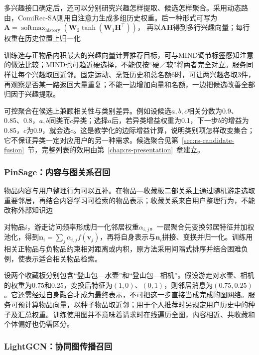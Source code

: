 多兴趣接口确定后，还可以分别研究兴趣怎样提取、候选怎样聚合。采用动态路由，ComiRec-SA则用自注意力生成多组历史权重。后一种形式可写为
$\bm A=\operatorname{softmax}_{\mathrm{history}}(\bm W_2\tanh(\bm W_1\bm H^\top))$，
再以$\bm A\bm H$得到多行兴趣向量；每行权重在历史位置上归一化

训练选与正物品内积最大的兴趣向量计算推荐目标，可与MIND调节标签感知注意的做法比较；MIND也可趋近硬选择，不能仅按“硬／软”将两者完全对立。服务同样让每个兴趣取回近邻。固定运动、烹饪历史和总名额6时，可让两兴趣各取3件，再观察是否某一路返回大量重复；不能一边增加向量和名额，一边把候选改善全部归因于兴趣提取。

可控聚合在候选上兼顾相关性与类别差异。例如设候选$a,b,c$相关分数为0.9、0.85、0.8，$a,b$同类而$c$异类；选择$a$后，若异类增益权重为0.1，下一步$b$的增益为0.85，$c$为0.9，就会选$c$。这是教学化的边际增益计算，说明类别项怎样改变集合；它不保证异类一定对应用户的另一种需求。候选聚合见第~\ref{sec:rs-candidate-fusion}~节，完整列表的效用由第~\ref{chap:rs-presentation}~章建立。

\subsubsection{PinSage：内容与图关系召回}
\label{sec:rs-pinsage}

物品内容与用户整理行为可以互补。在物品—收藏板二部关系上通过随机游走选取重要邻居，再结合内容学习可检索的物品表示；收藏关系来自用户整理行为，不能改称外部知识边

对物品$i$，游走访问频率形成归一化邻居权重$\alpha_{i,j}$。一层聚合先变换邻居特征并加权池化，得到$\bm n_i=\sum_j\alpha_{i,j}f(\bm v_j)$，再将自身表示与$\bm n_i$拼接、变换并归一化。训练用相关正物品与负物品约束相对距离或内积，原方法采用间隔式排序并结合困难负例，使表示适合相关物品检索。

设两个收藏板分别包含“登山包—水壶”和“登山包—相机”。假设游走对水壶、相机的权重为0.75和0.25，变换后特征为$(1,0)$、$(0,1)$，则邻居消息为$(0.75,0.25)$。它还需经过自身融合才成为最终表示，不可把这一步直接当成完成的图网络。服务可预计算物品向量，以种子物品取近邻；用于个人推荐时另规定用户历史中的种子及汇总权重。训练使用图并不意味着请求时在线遍历全图，内容相近、共收藏和个体偏好也仍需区分。

\subsubsection{LightGCN：协同图传播召回}
\label{sec:rs-lightgcn}

